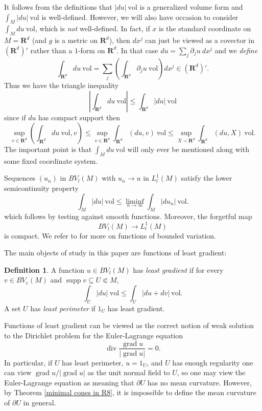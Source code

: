 \documentclass[reqno,12pt,letterpaper]{amsart}
\newcommand{\RR}{\mathbf{R}}
\DeclareMathOperator{\supp}{supp}
\DeclareMathOperator{\Div}{div}
\DeclareMathOperator{\grad}{grad}
\newcommand{\vol}{\mathrm{vol}}
\newcommand{\dfn}[1]{\emph{#1}\index{#1}}
\theoremstyle{definition}
\newtheorem{definition}[theorem]{Definition}
\numberwithin{equation}{section}
\begin{document}
It follows from the definitions that $|du| ~\vol$ is a generalized volume form and $\int_M |du| ~\vol$ is well-defined.
However, we will also have occasion to consider $\int_M du ~\vol$, which is \emph{not} well-defined.
In fact, if $x$ is the standard coordinate on $M = \RR^d$ (and $g$ is a metric on $\RR^d$), then $dx^j$ can just be viewed as a covector in $(\RR^d)'$ rather than a $1$-form on $\RR^d$.
In that case $du = \sum_j \partial_ju ~dx^j$ and we \emph{define}
$$\int_{\RR^d} du ~\vol = \sum_j \left(\int_{\RR^d} \partial_ju ~\vol \right) dx^j \in (\RR^d)'.$$
Thus we have the triangle inequality
\begin{equation}\label{connection triangle inequality}
\left|\int_{\RR^d} du ~\vol\right| \leq \int_{\RR^d} |du| ~\vol
\end{equation}
since if $du$ has compact support then
$$\sup_{v \in \RR^d} \left(\int_{\RR^d} du ~\vol, v\right) \leq \sup_{v \in \RR^d} \int_{\RR^d} (du, v) ~\vol \leq \sup_{X \prec \RR^d} \int_{\RR^d} (du, X) ~\vol.$$
The important point is that $\int_M du ~\vol$ will only ever be mentioned along with some fixed coordinate system.

Sequences $(u_n)$ in $BV_l(M)$ with $u_n \to u$ in $L^1_l(M)$ satisfy the lower semicontinuity property
\begin{equation}
\label{RieszMarkovDistr}
\int_M |du| ~\vol \leq \liminf_{n \to \infty} \int_M |du_n| ~\vol.
\end{equation}
which follows by testing against smooth functions.
Moreover, the forgetful map
\begin{equation}\label{Forget}
BV_l(M) \to L^1_l(M)
\end{equation}
is compact. We refer to \cite[Chapter 1]{Giusti77} for more on functions of bounded variation.

The main objects of study in this paper are functions of least gradient:

\begin{definition}\label{main definitions}
A function $u \in BV_l(M)$ has \dfn{least gradient} if for every $v \in BV_c(M)$ and $\supp v \subseteq U \Subset M$,
$$\int_U |du| ~\vol \leq \int_U |du + dv| ~\vol.$$
A set $U$ has \dfn{least perimeter} if $1_U$ has least gradient.
\end{definition}

Functions of least gradient can be viewed as the correct notion of weak solution to the Dirichlet problem for the Euler-Lagrange equation
\begin{equation}\label{EulerLagrange}
\Div \frac{\grad u}{|\grad u|} = 0.
\end{equation}
In particular, if $U$ has least perimeter, $u = 1_U$, and $U$ has enough regularity one can view $\grad u/|\grad u|$ as the unit normal field to $U$, so one may view the Euler-Lagrange equation as meaning that $\partial U$ has no mean curvature.
However, by Theorem \ref{minimal cones in R8}, it is impossible to define the mean curvature of $\partial U$ in general.
\end{document}
